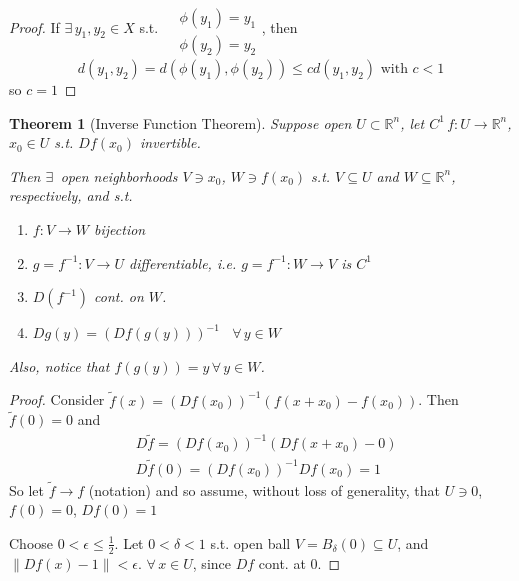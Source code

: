 \documentclass[10pt]{amsart}
\newtheorem{theorem}{Theorem}
\begin{document}
\begin{multicols*}{2}
\begin{proof}
If $\exists \, y_1,y_2 \in X$ s.t. $\begin{aligned} & \quad \\
  & \phi(y_1) = y_1 \\ 
  & \phi(y_2) = y_2 \end{aligned}$, then
\[
d(y_1,y_2) = d(\phi(y_1), \phi(y_2)) \leq c d(y_1,y_2) \text{ with } c <1
\]
so $c=1$
\end{proof}


\begin{theorem}[Inverse Function Theorem]
  Suppose open $U \subset \mathbb{R}^n$, let $C^1 \, f: U \to \mathbb{R}^n$, $x_0 \in U$ s.t. $Df(x_0)$ invertible.  


Then $\exists \,$ open neighborhoods $V\ni x_0$, $W \ni f(x_0)$ s.t. $V\subseteq U$ and $W\subseteq \mathbb{R}^n$, respectively, and s.t.

\begin{enumerate}
\item[(i)] $f: V\to W$ bijection
\item[(ii)] $g = f^{-1}:V \to U$ differentiable, i.e. $g = f^{-1}:W\to V$ is $C^1$
\item[(iii)] $D(f^{-1}) $ cont. on $W$.  
\item[(iv)] $Dg(y) = (Df(g(y)))^{-1}$ \, $\forall \, y \in W$
\end{enumerate}
Also, notice that $f(g(y)) = y \, \forall \, y \in W$.  
\end{theorem}

\begin{proof}

Consider $\widetilde{f}(x) = (Df(x_0))^{-1}(f(x+x_0) - f(x_0))$.  Then \\
\phantom{Consider} $\widetilde{f}(0) = 0$ and 
\[
\begin{aligned}
  &  D\widetilde{f}= (Df(x_0))^{-1}(Df(x+x_0) -0)  \\
  & D\widetilde{f}(0) = (Df(x_0))^{-1}Df(x_0)=1
\end{aligned}
\]  
So let $\widetilde{f}\to f$ (notation) and so assume, without loss of generality, that $U\ni 0$, $f(0)=0$, $Df(0)=1$

Choose $0 < \epsilon \leq \frac{1}{2}$.  Let $0< \delta <1$ s.t. open ball $V = B_{\delta}(0) \subseteq U$, and $\| Df(x)-1\| < \epsilon$.  $\forall \, x \in U$, since $Df$ cont. at $0$.  


\end{proof}
\end{multicols*}
\end{document}
